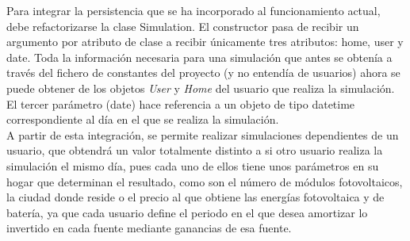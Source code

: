 Para integrar la persistencia que se ha incorporado al funcionamiento actual, debe refactorizarse la clase Simulation. El constructor pasa de recibir un argumento por atributo de clase a recibir únicamente tres atributos: home, user y date. Toda la información necesaria para una simulación que antes se obtenía a través del fichero de constantes del proyecto (y no entendía de usuarios) ahora se puede obtener de los objetos \textit{User} y \textit{Home} del usuario que realiza la simulación. El tercer parámetro (date) hace referencia a un objeto de tipo datetime correspondiente al día en el que se realiza la simulación.\\

A partir de esta integración, se permite realizar simulaciones dependientes de un usuario, que obtendrá un valor totalmente distinto a si otro usuario realiza la simulación el mismo día, pues cada uno de ellos tiene unos parámetros en su hogar que determinan el resultado, como son el número de módulos fotovoltaicos, la ciudad donde reside o el precio al que obtiene las energías fotovoltaica y de batería, ya que cada usuario define el periodo en el que desea amortizar lo invertido en cada fuente mediante ganancias de esa fuente.

